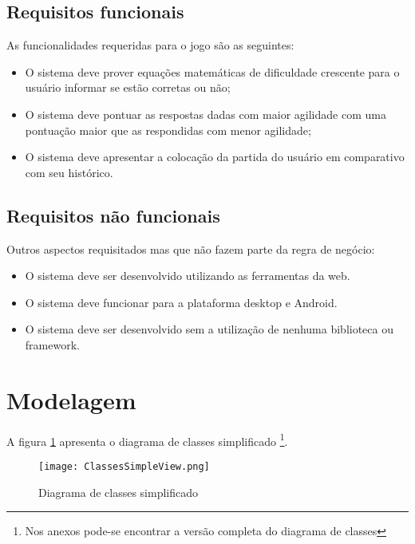 \subsection{Requisitos funcionais}

\noindent As funcionalidades requeridas para o jogo são as seguintes:

\begin{itemize}
    \item O sistema deve prover equações matemáticas de dificuldade crescente para o usuário informar se estão corretas ou não;
    \item O sistema deve pontuar as respostas dadas com maior agilidade com uma pontuação maior que as respondidas com menor agilidade;
    \item O sistema deve apresentar a colocação da partida do usuário em comparativo com seu histórico.
\end{itemize}

\subsection{Requisitos não funcionais}

\noindent Outros aspectos requisitados mas que não fazem parte da regra de negócio:

\begin{itemize}
    \item O sistema deve ser desenvolvido utilizando as ferramentas da web.
    \item O sistema deve funcionar para a plataforma desktop e Android.
    \item O sistema deve ser desenvolvido sem a utilização de nenhuma biblioteca ou framework.
\end{itemize}

\section{Modelagem}

A figura \ref{fig:simpleDiagram} apresenta o diagrama de classes
simplificado \footnote{Nos anexos pode-se encontrar a versão completa
do diagrama de classes}.

\begin{figure}[H]
    \centering
    \texttt{[image: ClassesSimpleView.png]}
	\caption{Diagrama de classes simplificado}
    \label{fig:simpleDiagram}
\end{figure}

